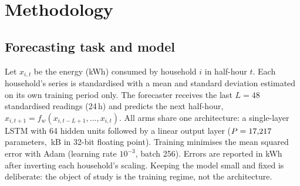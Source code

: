 \section{Methodology}\label{sec:method}

\subsection{Forecasting task and model}
Let $x_{i,t}$ be the energy (kWh) consumed by household $i$ in half-hour $t$. Each household's series is standardised
with a mean and standard deviation estimated on its own training period only. The forecaster receives the last
$L=48$ standardised readings (24\,h) and predicts the next half-hour,
$\hat{x}_{i,t+1} = f_w(x_{i,t-L+1},\ldots,x_{i,t})$. All arms share one architecture: a single-layer LSTM with 64
hidden units followed by a linear output layer ($P=17{,}217{}$ parameters, \PayloadKB{}\,kB in 32-bit floating point).
Training minimises the mean squared error with Adam (learning rate $10^{-3}$, batch 256). Errors are reported in kWh
after inverting each household's scaling. Keeping the model small and fixed is deliberate: the object of study is
the training regime, not the architecture.

